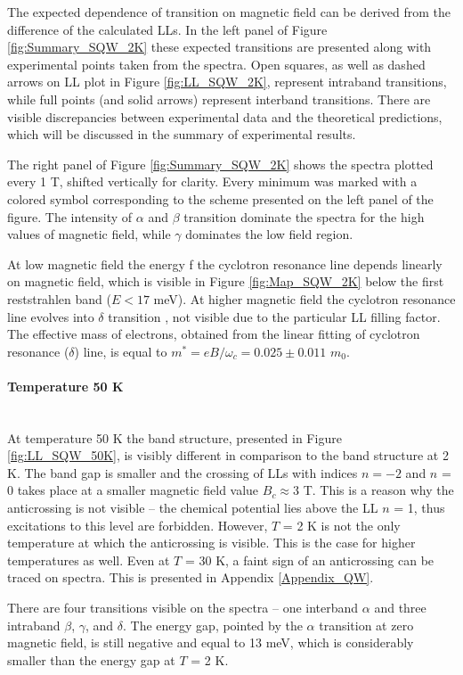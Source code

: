 \documentclass[titlepage,a4paper]{book}
\newcommand{\wciecie}{\quad\phantom{v}}
\newcommand{\myparagraph}[1]{\paragraph{#1}\mbox{}\\}
\begin{document}
The expected dependence of transition on magnetic field can be derived from the difference of the calculated LLs. In the left panel of Figure \ref{fig:Summary_SQW_2K} these expected transitions are presented along with experimental points taken from the spectra. Open squares, as well as dashed arrows on LL plot in Figure \ref{fig:LL_SQW_2K}, represent intraband transitions, while full points (and solid arrows) represent interband transitions. There are visible discrepancies between experimental data and the theoretical predictions, which will be discussed in the summary of experimental results.

The right panel of Figure \ref{fig:Summary_SQW_2K} shows the spectra plotted every 1 T, shifted vertically for clarity. Every minimum was marked with a colored symbol corresponding to the scheme presented on the left panel of the figure. The intensity of $\alpha$ and $\beta$ transition dominate the spectra for the high values of magnetic field, while $\gamma$ dominates the low field region.

At low magnetic field the energy f the cyclotron resonance line depends linearly on magnetic field, which is visible in Figure \ref{fig:Map_SQW_2K} below the first reststrahlen band ($E < 17$ meV). At higher magnetic field the cyclotron resonance line evolves into $\delta$ transition \cite{Orlita_MCT_QW}, not visible due to the particular LL filling factor. The effective mass of electrons, obtained from the linear fitting of cyclotron resonance ($\delta$) line, is equal to $m^* = eB/\omega_c = 0.025 \pm 0.011$ $m_0$.

\myparagraph{Temperature 50 K}
\wciecie
At temperature 50 K the band structure, presented in Figure \ref{fig:LL_SQW_50K}, is visibly different in comparison to the band structure at 2 K. The band gap is smaller and the crossing of LLs with indices $n = -2$ and $n$ = 0 takes place at a smaller magnetic field value $B_c \approx 3$ T. This is a reason why the anticrossing is not visible -- the chemical potential lies above the LL $n$ = 1, thus excitations to this level are forbidden. However, $T$ = 2 K is not the only temperature at which the anticrossing is visible. This is the case for higher temperatures as well. Even at $T$ = 30 K, a faint sign of an anticrossing can be traced on spectra. This is presented in Appendix \ref{Appendix_QW}.

There are four transitions visible on the spectra -- one interband $\alpha$ and three intraband $\beta$, $\gamma$, and $\delta$. The energy gap, pointed by the $\alpha$ transition at zero magnetic field, is still negative and equal to 13 meV, which is considerably smaller than the energy gap at $T$ = 2 K.
\end{document}
